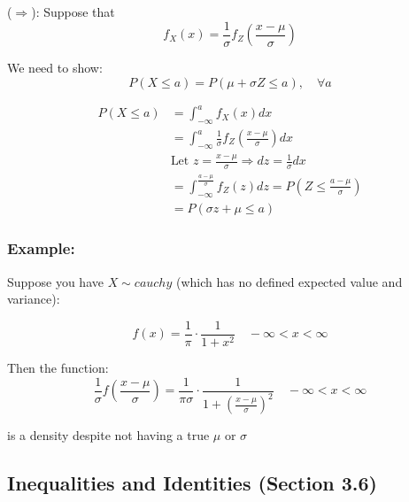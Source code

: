 \documentclass{article}
\begin{document}
    \noindent ($\Rightarrow$): Suppose that
    \begin{equation*}
        f_X(x) = \frac{1}{\sigma}f_Z(\frac{x-\mu}{\sigma})
    \end{equation*}
    
    We need to show:
    \begin{equation*}
        P(X\leq a) = P(\mu + \sigma Z \leq a), \quad \forall a
    \end{equation*}
    
    \begin{equation*}
    \begin{split}
        P(X \leq a) &= \int_{-\infty}^a f_X(x) dx\\
        &= \int_{-\infty}^a \frac{1}{\sigma} f_Z\left( \frac{x-\mu}{\sigma}\right) dx\\
        &\text{Let } z = \frac{x-\mu}{\sigma} \Rightarrow dz = \frac{1}{\sigma} dx\\
        &= \int_{-\infty}^{\frac{a-\mu}{\sigma}} f_Z(z) dz = P\left(Z \leq \frac{a-\mu}{\sigma}\right)\\
        &= P(\sigma z + \mu \leq a)
    \end{split}
    \end{equation*}
    
    
    \subsubsection*{Example:}
    Suppose you have $X \sim cauchy$ (which has no defined expected value and variance):
    
    \begin{equation*}
        f(x) = \frac{1}{\pi} \cdot \frac{1}{1+x^2} \quad -\infty < x < \infty
    \end{equation*}
    
    Then the function:
    \begin{equation*}
        \frac{1}{\sigma} f\left( \frac{x-\mu}{\sigma}\right) = \frac{1}{\pi\sigma} \cdot \frac{1}{1+\left(\frac{x-\mu}{\sigma} \right)^2} \quad -\infty < x < \infty
    \end{equation*}
    
    is a density despite not having a true $\mu$ or $\sigma$
    
    
    \subsection{Inequalities and Identities (Section 3.6)}
    
\end{document}
